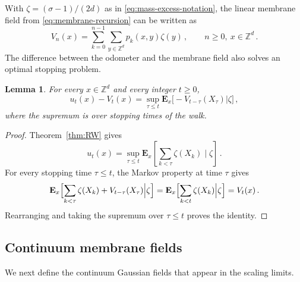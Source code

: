\documentclass[11pt]{amsart}
\theoremstyle{plain}
\newtheorem{lemma}[theorem]{Lemma}
\theoremstyle{definition}
\newcommand{\Z}{\mathbb{Z}}
\begin{document}
	With $\zeta=(\sigma-1)/(2d)$ as in \eqref{eq:mass-excess-notation}, the
	linear membrane field from \eqref{eq:membrane-recursion} can be written as 
	\begin{equation}\label{eq:linear-green-field}
		V_n(x)=\sum_{k=0}^{n-1}\sum_{y\in\Z^d}p_k(x,y)\zeta(y)\, ,
		\qquad n\geq0,\ x\in\Z^d\, .
	\end{equation}
	The difference between the odometer and the membrane field also solves an optimal stopping problem.
	\begin{lemma}\label{lem:difference-representation}
		For every $x\in\Z^d$ and every integer $t\geq0$,
		\[
			u_t(x)-V_t(x)
			=
			\sup_{\tau\leq t}\mathbf E_x\bigl[-V_{t-\tau}(X_\tau) \big| \zeta\bigr]\, ,
		\]
		where the supremum is over stopping times of the walk.
	\end{lemma}
	\begin{proof}
		Theorem~\ref{thm:RW} gives
		\[
			u_t(x)=\sup_{\tau\leq t}\mathbf E_x\left[\sum_{k<\tau}\zeta(X_k)\mid\zeta\right]\, .
		\]
		For every stopping time $\tau\leq t$, the Markov property at time $\tau$
		gives
		\[
			\mathbf E_x\Bigl[\sum_{k<\tau}\zeta(X_k)+V_{t-\tau}(X_\tau) \Big| \zeta\Bigr]
			=
			\mathbf E_x\Bigl[\sum_{k<t}\zeta(X_k) \Big| \zeta\Bigr]
			=V_t(x)\, .
		\]
		Rearranging and taking the supremum over $\tau\leq t$ proves the
		identity.
	\end{proof}

	\subsection{Continuum membrane fields}\label{ssec:continuum-membrane-fields}

    We next define the continuum Gaussian fields that appear in the scaling limits.
\end{document}
